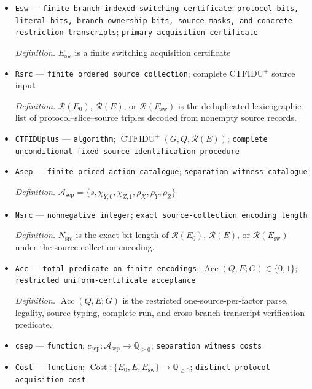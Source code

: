 \documentclass{article}
\begin{document}
\begin{itemize}
  \item \texttt{Esw} --- \texttt{finite branch-\allowbreak{}indexed switching certificate}; \texttt{protocol bits,\allowbreak{} literal bits,\allowbreak{} branch-\allowbreak{}ownership bits,\allowbreak{} source masks,\allowbreak{} and concrete restriction transcripts}; \texttt{primary acquisition certificate}
  \par\smallskip\noindent\emph{Definition.} \(E_{\mathrm{sw}}\) is a finite switching acquisition certificate
  \item \texttt{Rsrc} --- \texttt{finite ordered source collection}; complete CTFIDU\({}^{+}\) source input
  \par\smallskip\noindent\emph{Definition.} \(\mathcal R(E_0)\), \(\mathcal R(E)\), or \(\mathcal R(E_{\mathrm{sw}})\) is the deduplicated lexicographic list of protocol--slice--source triples decoded from nonempty source records.
  \item \texttt{CTFIDUplus} --- \texttt{algorithm}; \(\operatorname{CTFIDU}^{+}(G,Q,\mathcal R(E))\); \texttt{complete unconditional fixed-\allowbreak{}source identification procedure}
  \item \texttt{Asep} --- \texttt{finite priced action catalogue}; \texttt{separation witness catalogue}
  \par\smallskip\noindent\emph{Definition.} \(\mathcal A_{\mathrm{sep}}=\{s,\chi_{Y,0},\chi_{Z,1},\rho_X,\rho_Y,\rho_Z\}\)
  \item \texttt{Nsrc} --- \texttt{nonnegative integer}; \texttt{exact source-\allowbreak{}collection encoding length}
  \par\smallskip\noindent\emph{Definition.} \(N_{\mathrm{src}}\) is the exact bit length of \(\mathcal R(E_0)\), \(\mathcal R(E)\), or \(\mathcal R(E_{\mathrm{sw}})\) under the source-collection encoding.
  \item \texttt{Acc} --- \texttt{total predicate on finite encodings}; \(\operatorname{Acc}(Q,E;G)\in\{0,1\}\); \texttt{restricted uniform-\allowbreak{}certificate acceptance}
  \par\smallskip\noindent\emph{Definition.} \(\operatorname{Acc}(Q,E;G)\) is the restricted one-source-per-factor parse, legality, source-typing, complete-run, and cross-branch transcript-verification predicate.
  \item \texttt{csep} --- \texttt{function}; \(c_{\mathrm{sep}}:\mathcal A_{\mathrm{sep}}\to\mathbb Q_{\ge0}\); \texttt{separation witness costs}
  \item \texttt{Cost} --- \texttt{function}; \(\operatorname{Cost}:\{E_0,E,E_{\mathrm{sw}}\}\to\mathbb Q_{\ge0}\); \texttt{distinct-\allowbreak{}protocol acquisition cost}

\end{itemize}
\end{document}

